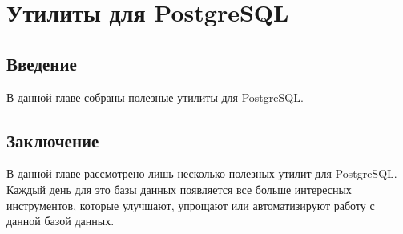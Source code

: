 \chapter{Утилиты для PostgreSQL}

\begin{epigraphs}
\end{epigraphs}

\section{Введение}

В данной главе собраны полезные утилиты для PostgreSQL.







\section{Заключение}

В данной главе рассмотрено лишь несколько полезных утилит для PostgreSQL. Каждый день для это базы данных появляется все больше интересных инструментов, которые улучшают, упрощают или автоматизируют работу с данной базой данных.
